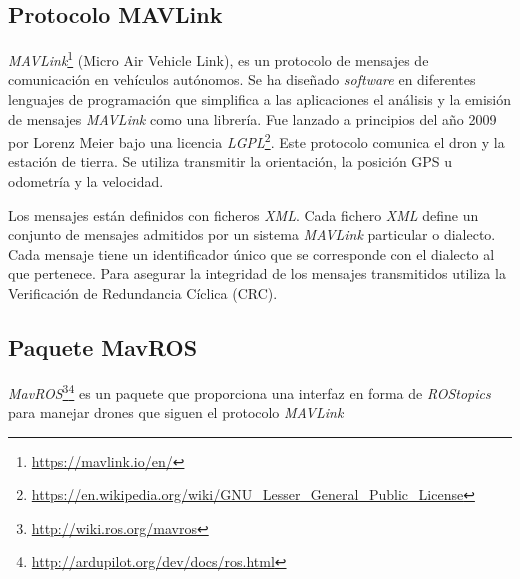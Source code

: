 \subsection{Protocolo MAVLink}
\textit{MAVLink}\footnote{\url{https://mavlink.io/en/}} (Micro Air Vehicle Link), es un protocolo de mensajes de comunicación en vehículos autónomos. Se ha diseñado \textit{software} en diferentes lenguajes de programación que simplifica a las aplicaciones el análisis y la emisión de mensajes \textit{MAVLink} como una librería. Fue lanzado a principios del año 2009 por Lorenz Meier bajo una licencia \textit{LGPL}\footnote{\url{https://en.wikipedia.org/wiki/GNU_Lesser_General_Public_License}}. Este protocolo comunica el dron y la estación de tierra. Se utiliza transmitir la orientación, la posición GPS u odometría y la velocidad.

Los mensajes están definidos con ficheros \textit{XML}. Cada fichero \textit{XML} define un conjunto de mensajes admitidos por un sistema \textit{MAVLink} particular o dialecto. Cada mensaje tiene un identificador único que se corresponde con el dialecto al que pertenece. Para asegurar la integridad de los mensajes transmitidos utiliza la Verificación de Redundancia Cíclica (CRC).

\subsection{Paquete MavROS}
\textit{MavROS}\footnote{\url{http://wiki.ros.org/mavros}}\footnote{\url{http://ardupilot.org/dev/docs/ros.html}} es un paquete que proporciona una interfaz en forma de \textit{ROStopics} para manejar drones que siguen el protocolo \textit{MAVLink}


